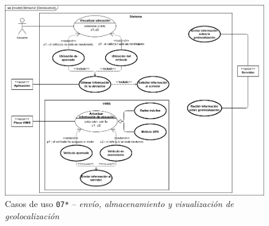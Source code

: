 \begin{figure}[H]
  \centering
  \includegraphics[width=\linewidth]{diagrams/UseCases-UC7 - location.png}
  \caption{Casos de uso \texttt{07*} -- \textit{envío, almacenamiento y visualización de geolocalización}}
  \label{uc:location}
\end{figure}

